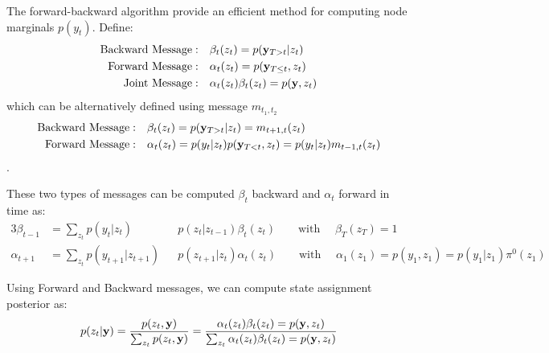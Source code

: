 \documentclass{article} %
\begin{document}
The forward-backward algorithm provide an efficient method for computing node marginals $p(y_t)$. Define:
\begin{align*}
\mbox{Backward Message}: \quad & 
\beta_t(z_t) = p({\bf y}_{T>t} | z_t)
\\
\mbox{Forward Message}: \quad &
\alpha_t(z_t) = p({\bf y}_{T \leq t}, z_t)
\\
\mbox{Joint Message}: \quad &
\alpha_t(z_t)\beta_t(z_t) = p({\bf y}, z_t)
\end{align*}
which can be alternatively defined using message $m_{t_1, t_2}$
\begin{align*}
\mbox{Backward Message}: \quad & 
\beta_t(z_t) = p({\bf y}_{T>t}|z_t) = m_{t+1, t}(z_t)
\\
\mbox{Forward Message}: \quad &
\alpha_t(z_t) = p(y_t | z_t ) p({\bf y}_{T<t}, z_t) = 
p(y_t | z_t ) m_{t-1, t}(z_t)
\end{align*}.

These two types of messages can be computed $\beta_t$ backward and $\alpha_t$ forward in time as:
\begin{alignat*}{3}
\beta_{t-1} &= \sum_{z_t} 
p(y_{t} | z_t ) && p(z_t | z_{t-1})  \beta_{t}(z_t)
\qquad \mbox{with } \quad
\beta_T(z_T) = 1
\\
\alpha_{t+1}  &=  \sum_{z_t} 
p(y_{t+1} | z_{t+1} ) && p(z_{t+1} | z_{t})  \alpha_{t}(z_t)
\qquad \mbox{with } \quad
\alpha_1(z_1) = p(y_1, z_1) = p(y_1 | z_1) \pi^0(z_1)
\end{alignat*}

Using Forward and Backward messages, we can compute state assignment posterior as:
\begin{align*}
p(z_t | {\bf y}) = \frac{p(z_t, {\bf y})}{\sum_{z_t} p(z_t, {\bf y})} 
= 
\frac{\alpha_t(z_t)\beta_t(z_t) = p({\bf y}, z_t)}
{\sum_{z_t} \alpha_t(z_t)\beta_t(z_t) = p({\bf y}, z_t)} 
\end{align*}



\newpage

\appendix



\clearpage
\end{document}
